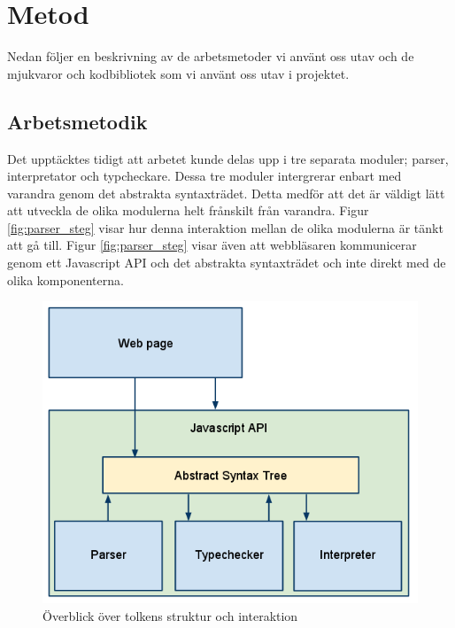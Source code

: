 \section{Metod} 

Nedan följer en beskrivning av de arbetsmetoder vi använt oss utav och de mjukvaror och kodbibliotek som vi använt oss utav i projektet. 

\subsection{Arbetsmetodik}

Det upptäcktes tidigt att arbetet kunde delas upp i tre separata moduler; parser, interpretator och typcheckare. Dessa tre moduler intergrerar enbart med varandra genom det abstrakta syntaxträdet. Detta medför att det är väldigt lätt att utveckla de olika modulerna helt frånskilt från varandra. Figur \ref{fig:parser_steg} visar hur denna interaktion mellan de olika modulerna är tänkt att gå till. Figur \ref{fig:parser_steg} visar även att webbläsaren kommunicerar genom ett Javascript API och det abstrakta syntaxträdet och inte direkt med de olika komponenterna. 

\begin{figure}[h]
    \begin{center}
        \includegraphics[width=1.0\textwidth]{image1.png}
        \caption{Överblick över tolkens struktur och interaktion}
        \label{fig:tolkens_struktur} %
    \end{center}
\end{figure}



